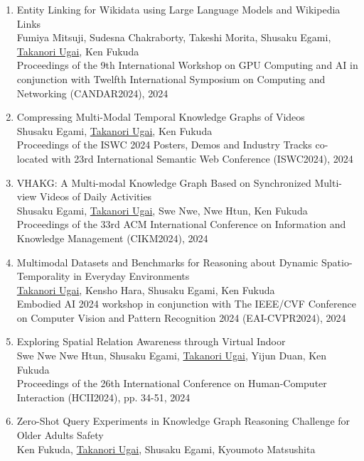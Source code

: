 \documentclass[dvipdfmx]{jlreq}
\begin{document}
\begin{enumerate}
\begin{enumerate}
\begin{enumerate}[label=\arabic*,align=right, labelsep=3pt]
Fumikatsu Anaguchi, Sudesna Chakraborty, Takeshi Morita, Shusaku Egami, \underline{Takanori Ugai}, Ken Fukuda\\
Proceedings of the Twelfth International Symposium on Computing and Networking (CANDAR2024), 2024
\item Entity Linking for Wikidata using Large Language Models and Wikipedia Links\\
Fumiya Mitsuji, Sudesna Chakraborty, Takeshi Morita, Shusaku Egami, \underline{Takanori Ugai}, Ken Fukuda\\
Proceedings of the 9th International Workshop on GPU Computing and AI in conjunction with Twelfth International Symposium on Computing and Networking (CANDAR2024), 2024
\item Compressing Multi-Modal Temporal Knowledge Graphs of Videos\\
Shusaku Egami, \underline{Takanori Ugai}, Ken Fukuda\\
Proceedings of the ISWC 2024 Posters, Demos and Industry Tracks co-located with 23rd International Semantic Web Conference (ISWC2024), 2024
\item VHAKG: A Multi-modal Knowledge Graph Based on Synchronized Multi-view Videos of Daily Activities\\
Shusaku Egami, \underline{Takanori Ugai}, Swe Nwe, Nwe Htun, Ken Fukuda\\
Proceedings of the 33rd ACM International Conference on Information and Knowledge Management (CIKM2024), 2024
\item Multimodal Datasets and Benchmarks for Reasoning about Dynamic Spatio-Temporality in Everyday Environments\\
\underline{Takanori Ugai}, Kensho Hara, Shusaku Egami, Ken Fukuda\\
Embodied AI 2024 workshop in conjunction with The IEEE/CVF Conference on Computer Vision and Pattern Recognition 2024 (EAI-CVPR2024), 2024
\item Exploring Spatial Relation Awareness through Virtual Indoor\\
Swe Nwe Nwe Htun, Shusaku Egami, \underline{Takanori Ugai}, Yijun Duan, Ken Fukuda\\
Proceedings of the 26th International Conference on Human-Computer Interaction (HCII2024), pp. 34-51, 2024
\item Zero-Shot Query Experiments in Knowledge Graph Reasoning Challenge for Older Adults Safety\\
Ken Fukuda, \underline{Takanori Ugai}, Shusaku Egami, Kyoumoto Matsushita\\

\end{enumerate}
\end{enumerate}
\end{enumerate}
\end{document}
